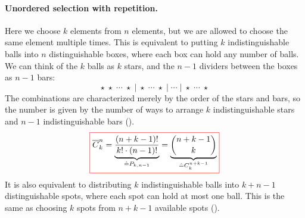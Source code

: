 \paragraph{Unordered selection with repetition.} \label{par:combinations_with_repetition}
Here we choose $k$ elements from $n$ elements, but we are allowed to choose the same element multiple times.
This is equivalent to putting $k$ indistinguishable balls into $n$ distinguishable boxes, where each box can hold any number of balls.
We can think of the $k$ balls as $k$ stars, and the $n-1$ dividers between the boxes as $n-1$ bars:
\[
  \star\;\star\;\cdots\;\star    %
  \;\big|\;                      %
  \star\;\cdots\;\star           %
  \;\big|\;
  \cdots                         %
  \;\big|\;
  \star\;\cdots\;\star           %
\]
The combinations are characterized merely by the order of the stars and bars, so the number is given by the number of ways to arrange $k$ indistinguishable stars and $n-1$ indistinguishable bars ().
\begin{equation}\label{eq:combinations_with_repetition}
  \fcolorbox{red}{white}{$\displaystyle
  \overline{C}^n_k
  =
  \underbrace{
  \frac{(n+k-1)!}{k! \cdot (n-1)!}
  }_{
  \hat{=}
  P_{k, n-1}
  }
  =
  \underbrace{
  \binom{n+k-1}{k}
  }_{
  \hat{=}
  C^{n+k-1}_{k}
  }
  $}
\end{equation}
It is also equivalent to distributing $k$ indistinguishable balls into $k + n - 1$ distinguishable spots, where each spot can hold at most one ball.
This is the same as choosing $k$ spots from $n + k - 1$ available spots ().

